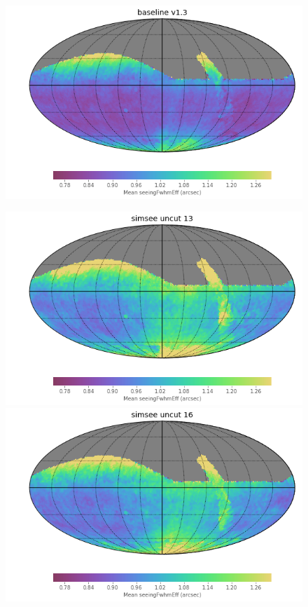 \documentclass[DM,authoryear,toc]{lsstdoc}
\begin{document}
\begin{figure}
\begin{center}
  \includegraphics[width=\columnwidth]{./figures/seeing_map_baseline_v1_3_10yrs.png}
\endminipage\hfill
\end{center}
  \includegraphics[width=\columnwidth]{./figures/seeing_map_ss58777y13_v1_3_10yrs.png}
\endminipage\hfill
{}
  \includegraphics[width=\columnwidth]{./figures/seeing_map_ss58777y16_v1_3_10yrs.png}

\end{figure}
\end{document}
